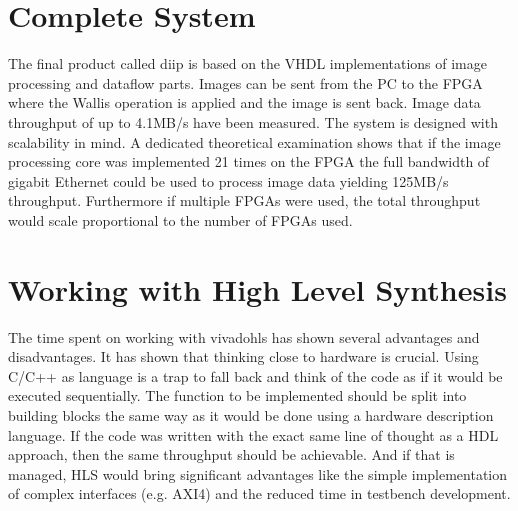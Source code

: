 %
%
\section{Complete System}
The final product called \gls{diip} is based on the VHDL implementations of
image processing and dataflow parts. Images can be sent from the PC to the FPGA
where
the Wallis operation is applied and the image is sent back. Image data
throughput of up to 4.1MB/s have been measured. The system is designed with
scalability in mind. A dedicated theoretical examination shows that if the
image processing core was implemented 21 times on the FPGA the full bandwidth of
gigabit Ethernet could be used to process image data yielding 125MB/s
throughput. Furthermore if multiple FPGAs were used, the total throughput would
scale proportional to the number of FPGAs used.

%
%
\section{Working with High Level Synthesis}
The time spent on working with \gls{vivadohls} has shown several advantages and
disadvantages. It has shown that thinking close to hardware is crucial. Using
C/C++ as language is a trap to fall back and think of the code as if it would be
executed sequentially. The function to be implemented should be split into
building blocks the same way as it would be done using a hardware description
language. If the code was written with the exact same line of thought as a HDL
approach, then the same throughput should be achievable. And if that is managed,
HLS would bring significant advantages like the simple implementation of complex
interfaces (e.g. AXI4) and the reduced time in testbench development.

%
%
